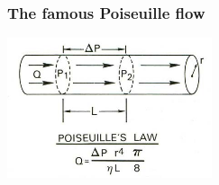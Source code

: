 \begin{frame}
 \frametitle{The famous Poiseuille flow}
 \begin{center}
 \includegraphics[width=6cm]{png/poiseuille_law.png}
 \end{center}
\end{frame}

